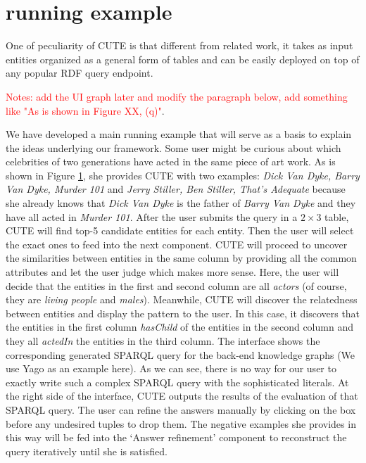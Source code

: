 \documentclass[10pt,conference,letterpaper]{IEEEtran}
\newcommand{\res}{CUTE }
\begin{document}
\section{running example}

One of peculiarity of \res is that different from related work, it takes as input entities organized as a general form of tables and can be easily deployed on top of any popular RDF query endpoint.

\textcolor{red}{Notes: add the UI graph later and modify the paragraph below, add something like "As is shown in Figure XX, (q)"}.

We have developed a main running example that will serve as a basis to explain the ideas underlying our framework. Some user might be curious about which celebrities of two generations have acted in the same piece of art work. As is shown in Figure \ref{}, she provides CUTE with two examples: \emph{Dick Van Dyke, Barry Van Dyke, Murder 101} and \emph{Jerry Stiller, Ben Stiller, That's Adequate} because she already knows that \emph{Dick Van Dyke} is the father of \emph{Barry Van Dyke} and they have all acted in \emph{Murder 101}. After the user submits the query in a $2\times3$ table, CUTE will find top-5 candidate entities for each entity. Then the user will select the exact ones to feed into the next component. CUTE will proceed to uncover the similarities between entities in the same column by providing all the common attributes and let the user judge which makes more sense. Here, the user will decide that the entities in the first and second column are all \emph{actors} (of course, they are \emph{living people} and \emph{males}). Meanwhile, CUTE will discover the relatedness between entities and display the pattern to the user. In this case, it discovers that the entities in the first column \emph{hasChild} of the entities in the second column and they all \emph{actedIn} the entities in the third column. The interface shows the corresponding generated SPARQL query for the back-end knowledge graphs (We use Yago as an example here). As we can see, there is no way for our user to exactly write such a complex SPARQL query with the sophisticated literals. At the right side of the interface, CUTE outputs the results of the evaluation of that SPARQL query. The user can refine the answers manually by clicking on the box before any undesired tuples to drop them. The negative examples she provides in this way will be fed into the `Answer refinement' component to reconstruct the query iteratively until she is satisfied.
\end{document}
